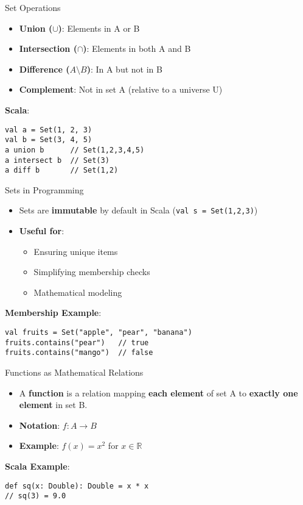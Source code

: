 \documentclass{beamer}
\begin{document}
\begin{frame}{Set Operations}
\begin{itemize}
    \item \textbf{Union ($\cup$)}: Elements in A or B
    \item \textbf{Intersection ($\cap$)}: Elements in both A and B
    \item \textbf{Difference ($A \setminus B$)}: In A but not in B
    \item \textbf{Complement}: Not in set A (relative to a universe U)
\end{itemize}

\textbf{Scala}:
\begin{lstlisting}
val a = Set(1, 2, 3)
val b = Set(3, 4, 5)
a union b      // Set(1,2,3,4,5)
a intersect b  // Set(3)
a diff b       // Set(1,2)
\end{lstlisting}
\end{frame}

\begin{frame}{Sets in Programming}
\begin{itemize}
    \item Sets are \textbf{immutable} by default in Scala (\texttt{val s = Set(1,2,3)})
    \item \textbf{Useful for}:
    \begin{itemize}
        \item Ensuring unique items
        \item Simplifying membership checks
        \item Mathematical modeling
    \end{itemize}
\end{itemize}

\textbf{Membership Example}:
\begin{lstlisting}
val fruits = Set("apple", "pear", "banana")
fruits.contains("pear")   // true
fruits.contains("mango")  // false
\end{lstlisting}
\end{frame}

\begin{frame}{Functions as Mathematical Relations}
\begin{itemize}
    \item A \textbf{function} is a relation mapping \textbf{each element} of set A to \textbf{exactly one element} in set B.
    \item \textbf{Notation}: $f : A \rightarrow B$
    \item \textbf{Example}: $f(x) = x^2$ for $x \in \mathbb{R}$
\end{itemize}

\textbf{Scala Example}:
\begin{lstlisting}
def sq(x: Double): Double = x * x
// sq(3) = 9.0
\end{lstlisting}
\end{frame}
\end{document}
